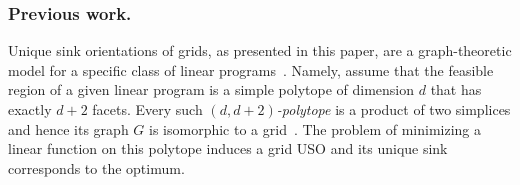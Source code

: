 \documentclass[runningheads,a4paper]{llncs}
\newcommand{\RR}{\ensuremath{\mathbb{R}}}
\begin{document}
\subsubsection{Previous work.}

Unique sink orientations of grids, as presented in this paper,
are a graph-theoretic model for a specific class of linear programs~\cite{grid05}.
Namely, assume that the feasible region of a given linear program is a
simple polytope of dimension $d$ that has exactly $d+2$ facets.
Every such \emph{$(d, d+2)$-polytope} is a product of two simplices and hence its graph $G$ is isomorphic to a grid~\cite{grid05}. 
The problem of minimizing a linear function on this polytope induces a grid USO and its unique sink corresponds to the optimum. 

\end{document}
